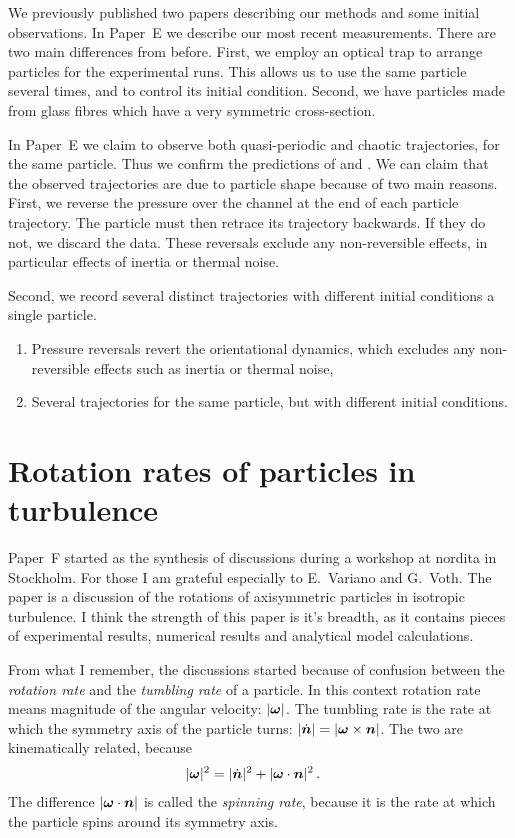 \documentclass[thesis.tex]{subfiles}
\begin{document}
We previously published two papers \cite{mishra2012,einarsson2013} describing our methods and some initial observations. In Paper~E we describe our most recent measurements. There are two main differences from before. First, we employ an optical trap to arrange particles for the experimental runs. This allows us to use the same particle several times, and to control its initial condition. Second, we have particles made from glass fibres which have a very symmetric cross-section.

In Paper~E we claim to observe both quasi-periodic and chaotic trajectories, for the same particle. Thus we confirm the predictions of \citet{hinch1979} and \citet{yarin1997}. We can claim that the observed trajectories are due to particle shape because of two main reasons. First, we reverse the pressure over the channel at the end of each particle trajectory. The particle must then retrace its trajectory backwards. If they do not, we discard the data. These reversals exclude any non-reversible effects, in particular effects of inertia or thermal noise.

Second, we record several distinct trajectories with different initial conditions a single particle.
\begin{enumerate}
    \item Pressure reversals revert the orientational dynamics, which excludes any non-reversible effects such as inertia or thermal noise,
    \item Several trajectories for the same particle, but with different initial conditions.
\end{enumerate}

\chapter{Rotation rates of particles in turbulence}
Paper~F started as the synthesis of discussions during a workshop at {\sc nordita} in Stockholm. For those I am grateful especially to E.~Variano and G.~Voth. The paper is a discussion of the rotations of axisymmetric particles in isotropic turbulence. I think the strength of this paper is it's breadth, as it contains pieces of experimental results, numerical results and analytical model calculations.

From what I remember, the discussions started because of confusion between the \emph{rotation rate} and the \emph{tumbling rate} of a particle. In this context rotation rate means magnitude of the angular velocity: $|\mbox{\boldmath$\omega$}|$. The tumbling rate is the rate at which the symmetry axis of the particle turns: $|\dot{\mbox{\boldmath$n$}}|=|\mbox{\boldmath$\omega$} \times \mbox{\boldmath$n$}|$. The two are kinematically related, because
\begin{align}
    |\mbox{\boldmath$\omega$}|^2 &= |\dot{\mbox{\boldmath$n$}}|^2 + |\mbox{\boldmath$\omega$} \cdot \mbox{\boldmath$n$}|^2\,.
\end{align}
The difference $|\mbox{\boldmath$\omega$} \cdot \mbox{\boldmath$n$}|$ is called the \emph{spinning rate}, because it is the rate at which the particle spins around its symmetry axis.
\end{document}
